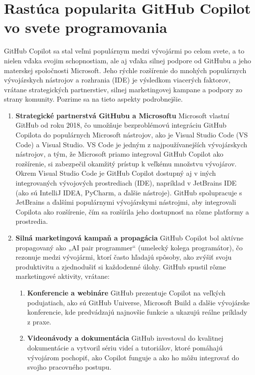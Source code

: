 \documentclass[10pt,oneside,slovak,a4paper, onecolumn]{article}
\begin{document}
\section{Rastúca popularita GitHub Copilot vo svete programovania}
GitHub Copilot sa stal veľmi populárnym medzi vývojármi po celom svete, a to nielen vďaka svojim schopnostiam, ale aj vďaka silnej podpore od GitHubu a jeho materskej spoločnosti Microsoft. Jeho rýchle rozšírenie do mnohých populárnych vývojárskych nástrojov a rozhrania (IDE) je výsledkom viacerých faktorov, vrátane strategických partnerstiev, silnej marketingovej kampane a podpory zo strany komunity. Pozrime sa na tieto aspekty podrobnejšie.
\begin{enumerate}
    \item \textbf{Strategické partnerstvá GitHubu a Microsoftu}
    Microsoft vlastní GitHub od roku 2018, čo umožňuje bezproblémovú integráciu GitHub Copilota do populárnych Microsoft nástrojov, ako je Visual Studio Code (VS Code) a Visual Studio. VS Code je jedným z najpoužívanejších vývojárskych nástrojov, a tým, že Microsoft priamo integroval GitHub Copilot ako rozšírenie, si zabezpečil okamžitý prístup k veľkému množstvu vývojárov.
Okrem Visual Studio Code je GitHub Copilot dostupný aj v iných integrovaných vývojových prostrediach (IDE), napríklad v JetBrains IDE (ako sú IntelliJ IDEA, PyCharm, a ďalšie nástroje). GitHub spolupracuje s JetBrains a ďalšími populárnymi vývojárskymi nástrojmi, aby integrovali Copilota ako rozšírenie, čím sa rozšírila jeho dostupnosť na rôzne platformy a prostredia.
    \item \textbf{Silná marketingová kampaň a propagácia}
    GitHub Copilot bol aktívne propagovaný ako „AI pair programmer“ (umelecký kolega programátor), čo rezonuje medzi vývojármi, ktorí často hľadajú spôsoby, ako zvýšiť svoju produktivitu a zjednodušiť si každodenné úlohy. GitHub spustil rôzne marketingové aktivity, vrátane:
    \begin{enumerate}
    \item \textbf{Konferencie a webináre}
    GitHub prezentuje Copilot na veľkých podujatiach, ako sú GitHub Universe, Microsoft Build a ďalšie vývojárske konferencie, kde predvádzajú najnovšie funkcie a ukazujú reálne príklady z praxe.
    \item \textbf{Videonávody a dokumentácia}
    GitHub investoval do kvalitnej dokumentácie a vytvoril sériu videí a tutoriálov, ktoré pomáhajú vývojárom pochopiť, ako Copilot funguje a ako ho môžu integrovať do svojho pracovného postupu.
    \end{enumerate}

\end{enumerate}
\end{document}
